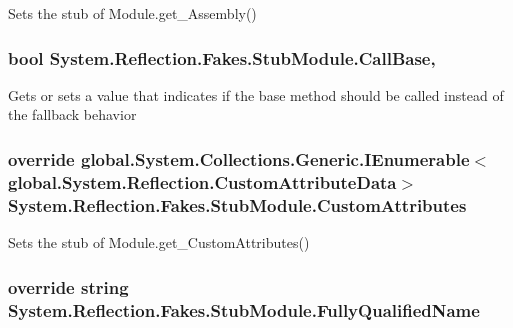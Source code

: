 Sets the stub of Module.\-get\-\_\-\-Assembly()

\hypertarget{class_system_1_1_reflection_1_1_fakes_1_1_stub_module_a676f0b049fb2afe81c1bc301c7d2157e}{
\subsubsection[{Call\-Base}]{\setlength{\rightskip}{0pt plus 5cm}bool System.\-Reflection.\-Fakes.\-Stub\-Module.\-Call\-Base\hspace{0.3cm}{\ttfamily [get]}, {\ttfamily [set]}}}\label{class_system_1_1_reflection_1_1_fakes_1_1_stub_module_a676f0b049fb2afe81c1bc301c7d2157e}


Gets or sets a value that indicates if the base method should be called instead of the fallback behavior

\hypertarget{class_system_1_1_reflection_1_1_fakes_1_1_stub_module_ad27f99716b7d464956b3f55cb8fc030c}{
\subsubsection[{Custom\-Attributes}]{\setlength{\rightskip}{0pt plus 5cm}override global.\-System.\-Collections.\-Generic.\-I\-Enumerable$<$global.\-System.\-Reflection.\-Custom\-Attribute\-Data$>$ System.\-Reflection.\-Fakes.\-Stub\-Module.\-Custom\-Attributes\hspace{0.3cm}{\ttfamily [get]}}}\label{class_system_1_1_reflection_1_1_fakes_1_1_stub_module_ad27f99716b7d464956b3f55cb8fc030c}


Sets the stub of Module.\-get\-\_\-\-Custom\-Attributes()

\hypertarget{class_system_1_1_reflection_1_1_fakes_1_1_stub_module_a3437e6a1658c7691698b6602f3e9ee95}{
\subsubsection[{Fully\-Qualified\-Name}]{\setlength{\rightskip}{0pt plus 5cm}override string System.\-Reflection.\-Fakes.\-Stub\-Module.\-Fully\-Qualified\-Name\hspace{0.3cm}{\ttfamily [get]}}}\label{class_system_1_1_reflection_1_1_fakes_1_1_stub_module_a3437e6a1658c7691698b6602f3e9ee95}


